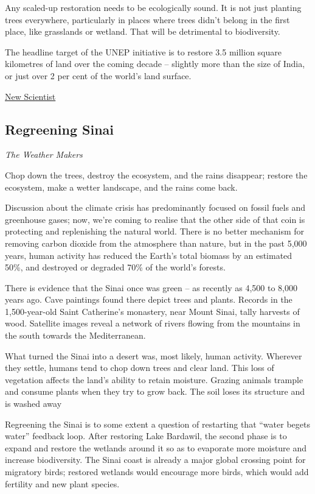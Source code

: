 \documentclass[
]{book}
\begin{document}
Any scaled-up restoration needs to be ecologically sound.
It is not just planting trees everywhere, particularly in places where trees
didn't belong in the first place, like grasslands or wetland.
That will be detrimental to biodiversity.

The headline target of the UNEP initiative is to restore 3.5 million square kilometres of land over the coming decade -- slightly more than the size of India, or just over 2 per cent of the world's land surface.

\href{https://www.newscientist.com/article/mg24933223-300-rescue-plan-for-nature-how-to-fix-the-biodiversity-crisis/}{New Scientist}

\hypertarget{regreening-sinai}{%
\subsection{Regreening Sinai}\label{regreening-sinai}}

\emph{The Weather Makers}

Chop down the trees, destroy the ecosystem, and the rains disappear;
restore the ecosystem, make a wetter landscape, and the rains come back.

Discussion about the climate crisis has predominantly focused on fossil fuels and greenhouse gases;
now, we're coming to realise that the other side of that coin is
protecting and replenishing the natural world.
There is no better mechanism for removing carbon dioxide from the atmosphere than nature, but in the past 5,000 years, human activity has reduced the Earth's total biomass by an estimated 50\%, and destroyed or degraded 70\% of the world's forests.

There is evidence that the Sinai once was green -- as recently as 4,500 to 8,000 years ago. Cave paintings found there depict trees and plants. Records in the 1,500-year-old Saint Catherine's monastery, near Mount Sinai, tally harvests of wood. Satellite images reveal a network of rivers flowing from the mountains in the south towards the Mediterranean.

What turned the Sinai into a desert was, most likely, human activity. Wherever they settle, humans tend to chop down trees and clear land. This loss of vegetation affects the land's ability to retain moisture. Grazing animals trample and consume plants when they try to grow back. The soil loses its structure and is washed away

Regreening the Sinai is to some extent a question of restarting that ``water begets water'' feedback loop. After restoring Lake Bardawil, the second phase is to expand and restore the wetlands around it so as to evaporate more moisture and increase biodiversity. The Sinai coast is already a major global crossing point for migratory birds; restored wetlands would encourage more birds, which would add fertility and new plant species.
\end{document}
